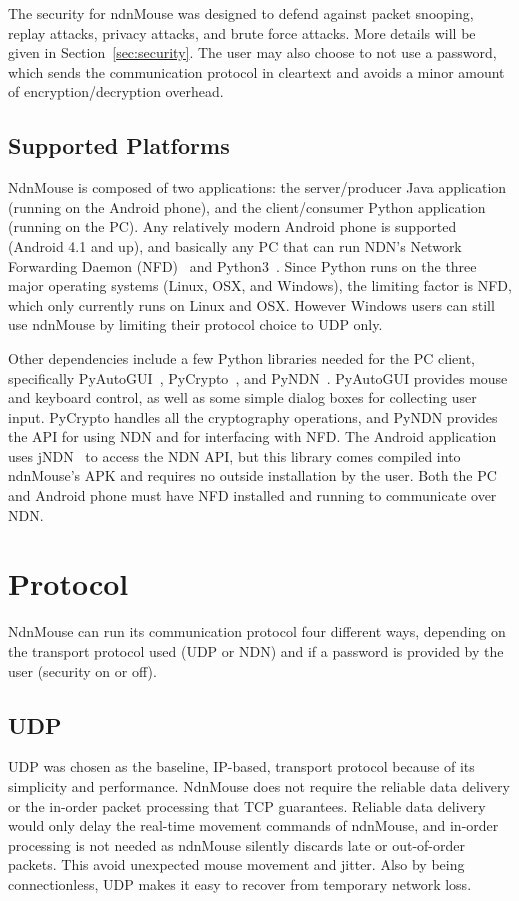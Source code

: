 \documentclass{sig-alternate}
\renewcommand\_{\textunderscore\allowbreak}  %
\begin{document}
The security for ndnMouse was designed to defend against packet snooping, replay attacks, privacy attacks, and brute force attacks. More details will be given in Section~\ref{sec:security}. The user may also choose to not use a password, which sends the communication protocol in cleartext and avoids a minor amount of encryption/decryption overhead. 

\subsection{Supported Platforms}
NdnMouse is composed of two applications: the server/producer Java application (running on the Android phone), and the client/consumer Python application (running on the PC). Any relatively modern Android phone is supported (Android 4.1 and up), and basically any PC that can run NDN's Network Forwarding Daemon (NFD)~\cite{nfd} and Python3~\cite{python3}. Since Python runs on the three major operating systems (Linux, OSX, and Windows), the limiting factor is NFD, which only currently runs on Linux and OSX. However Windows users can still use ndnMouse by limiting their protocol choice to UDP only.

Other dependencies include a few Python libraries needed for the PC client, specifically PyAutoGUI~\cite{pyautogui}, PyCrypto~\cite{pycrypto}, and PyNDN~\cite{pyndn}. PyAutoGUI provides mouse and keyboard control, as well as some simple dialog boxes for collecting user input. PyCrypto handles all the cryptography operations, and PyNDN provides the API for using NDN and for interfacing with NFD. The Android application uses jNDN~\cite{jndn} to access the NDN API, but this library comes compiled into ndnMouse's APK and requires no outside installation by the user. Both the PC and Android phone must have NFD installed and running to communicate over NDN.

\section{Protocol}
\label{sec:protocol}
NdnMouse can run its communication protocol four different ways, depending on the transport protocol used (UDP or NDN) and if a password is provided by the user (security on or off).

\subsection{UDP}
UDP was chosen as the baseline, IP-based, transport protocol because of its simplicity and performance. NdnMouse does not require the reliable data delivery or the in-order packet processing that TCP guarantees. Reliable data delivery would only delay the real-time movement commands of ndnMouse, and in-order processing is not needed as ndnMouse silently discards late or out-of-order packets. This avoid unexpected mouse movement and jitter. Also by being connectionless, UDP makes it easy to recover from temporary network loss. 
\end{document}

